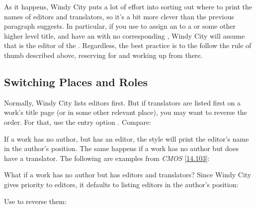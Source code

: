 \documentclass[11pt,letterpaper,oneside]{article}
\begin{document}
As it happens, Windy City puts a lot of effort into sorting out where
to print the names of editors and translators, so it's a bit more
clever than the previous paragraph suggests. In particular, if you use
 to assign an  to a
 or some other higher level title, and have an
 with no corresponding , Windy
City will assume that  is the editor of the
. Regardless, the best practice is to the follow the rule
of thumb described above, reserving  for
 and working up from there.

\subsection{Switching Places and Roles}
\label{edtranspos}

Normally, Windy City lists editors first. But if translators are
listed first on a work's title page (or in some other relevant place),
you may want to reverse the order. For that, use the entry option
. Compare:

\begin{citebib}
\item \cite{doe2010a}
\item \cite{doe2010b}
\end{citebib}

If a work has no author, but has an editor, the style will print the
editor's name in the author's position. The same happens if a work has
no author but does have a translator. The following are examples from
\textit{CMOS} \ref{14.103}:

\begin{citebib}
\item \cite[100]{egan2014}
\item \cite[34]{silverstein1974}
\end{citebib}

What if a work has no author but has editors and translators? Since
Windy City gives priority to editors, it defaults to listing editors
in the author's position:

\begin{citebib}
\item \cite{smith2002a}
\end{citebib}

\noindent Use  to reverse them:

\begin{citebib}
\item \cite{smith2002b}
\end{citebib}
\end{document}
